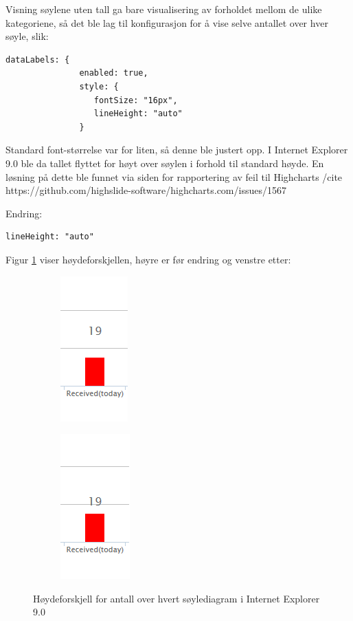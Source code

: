 Visning søylene uten tall ga bare visualisering av forholdet mellom de ulike kategoriene, så det ble lag til konfigurasjon for å vise selve antallet over hver søyle, slik: 

\begin{lstlisting}
dataLabels: {
               enabled: true,
               style: {
                  fontSize: "16px",
                  lineHeight: "auto"
               }
\end{lstlisting}

Standard font-størrelse var for liten, så denne ble justert opp. I Internet Explorer 9.0 ble da tallet flyttet for høyt over søylen i forhold til standard høyde. En løsning på dette ble funnet via siden for rapportering av feil til Highcharts /cite https://github.com/highslide-software/highcharts.com/issues/1567

Endring:

\begin{lstlisting}
lineHeight: "auto"
\end{lstlisting}

Figur \ref{IE_bug} viser høydeforskjellen, høyre er før endring og venstre etter:

\begin{figure}[H]
\centering
\begin{subfigure}
  \centering
  \includegraphics[scale=0.7]{img/IE_footprints_bug}
\end{subfigure}
\begin{subfigure}
  \centering
  \includegraphics[scale=0.7]{img/IE_footprints_fix}
\end{subfigure}
\caption{Høydeforskjell for antall over hvert søylediagram i Internet Explorer 9.0}
\label{IE_bug}
\end{figure}



